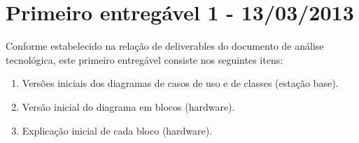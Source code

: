 \chapter{Primeiro entregável 1 - 13/03/2013}

Conforme estabelecido na relação de deliverables do documento de análise tecnológica, este primeiro entregável consiste nos seguintes itens:
\begin{enumerate}[topsep=0pt, partopsep=0pt, itemsep=0pt]
	\item Versões iniciais dos diagramas de casos de uso e de classes (estação base).
	\item Versão inicial do diagrama em blocos (hardware).
	\item Explicação inicial de cada bloco (hardware).
\end{enumerate}

